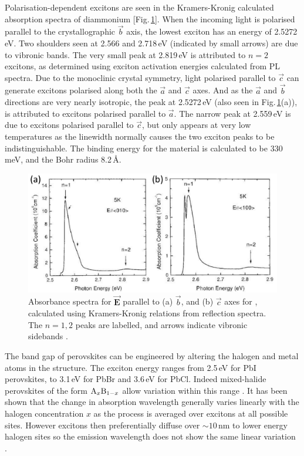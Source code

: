 Polarisation-dependent excitons are seen in the Kramers-Kronig calculated absorption spectra of diammonium  [Fig.\,\ref{2Fig14}]. When the incoming light is polarised parallel to the crystallographic $\vec{b}$ axis, the lowest exciton has an energy of 2.5272\,eV. Two shoulders seen at 2.566 and 2.718\,eV (indicated by small arrows) are due to vibronic bands. The very small peak at 2.819\,eV is attributed to $n=2$ excitons, as determined using exciton activation energies calculated from PL spectra. Due to the monoclinic crystal symmetry, light polarised parallel to $\vec{c}$ can generate excitons polarised along both the $\vec{a}$ and $\vec{c}$ axes. And as the $\vec{a}$ and $\vec{b}$ directions are very nearly isotropic, the peak at 2.5272\,eV (also seen in Fig.\,\ref{2Fig14}(a)), is attributed to excitons polarised parallel to $\vec{a}$. The narrow peak at 2.559\,eV is due to excitons polarised parallel to $\vec{c}$, but only appears at very low temperatures as the linewidth normally causes the two exciton peaks to be indistinguishable. The binding energy for the material is calculated to be 330\,meV, and the Bohr radius 8.2\,\AA \cite{Goto2001}.
\begin{figure} [h!]
\centering
\includegraphics[width=\textwidth]{Fig14}
\caption{Absorbance spectra for $\vec{\mathbf{E}}$ parallel to (a) $\vec{b}$, and (b) $\vec{c}$ axes for , calculated using Kramers-Kronig relations from reflection spectra. The $n=1, 2$ peaks are labelled, and arrows indicate vibronic sidebands \cite{Goto2001}.}
\label{2Fig14}
\end{figure}

The band gap of perovskites can be engineered by altering the halogen and metal atoms in the structure. The exciton energy ranges from 2.5\,eV for PbI perovskites, to 3.1\,eV for PbBr and 3.6\,eV for PbCl. Indeed mixed-halide perovskites of the form $\textnormal{A}_x\textnormal{B}_{1-x}$ allow variation within this range \cite{Kitazawa1996, Kitazawa1997}. It has been shown that the change in absorption wavelength generally varies linearly with the halogen concentration $x$ as the process is averaged over excitons at all possible sites. However excitons then preferentially diffuse over $\sim10$\,nm to lower energy halogen sites so the emission wavelength does not show the same linear variation \cite{Ahmad2013}.

